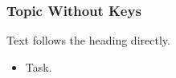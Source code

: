 \subsubsection{Topic Without Keys}

Text follows the heading directly.

\begin{itemize}[label=\unchecked]
\item Task.
\end{itemize}
